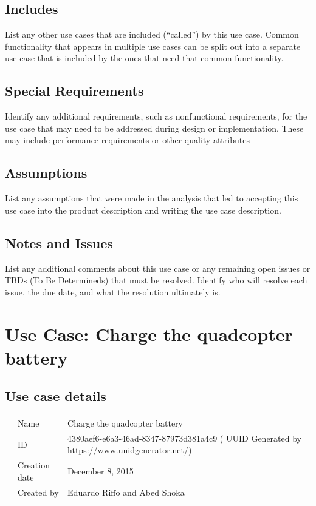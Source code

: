 \documentclass[a4paper]{article}
\begin{document}
\subsection{Includes}
List any other use cases that are included (“called”) by this use case. Common functionality that appears in multiple use cases can be split out into a separate use case that is included by the ones that need that common functionality.
\subsection{Special Requirements}
Identify any additional requirements, such as nonfunctional requirements, for the use case that may need to be addressed during design or implementation. These may include performance requirements or other quality attributes
\subsection{Assumptions}
List any assumptions that were made in the analysis that led to accepting this use case into the product description and writing the use case description.
\subsection{Notes and Issues}
List any additional comments about this use case or any remaining open issues or TBDs (To Be Determineds) that must be resolved. Identify who will resolve each issue, the due date, and what the resolution ultimately is.

\newpage
\section{Use Case: Charge the quadcopter battery}
\subsection{Use case details}

\begin{tabular}{lll}
	&Name  &Charge the quadcopter battery  \\
	&ID  &4380aef6-e6a3-46ad-8347-87973d381a4c9 ( UUID Generated by https://www.uuidgenerator.net/)  \\
	&Creation date  & December 8, 2015  \\
	&Created by  &Eduardo Riffo and Abed Shoka   
\end{tabular}
\end{document}
